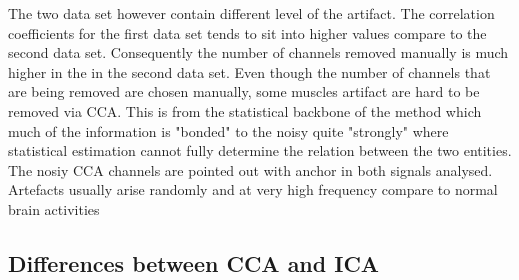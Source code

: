 The two data set however contain different level of the artifact. The correlation coefficients for the first data set tends to sit into higher values compare to the second data set. Consequently the number of channels removed manually is much higher in the in the second data set. Even though the number of channels that are being removed are chosen manually, some  muscles artifact are hard to be removed via CCA. This is from the statistical backbone of the method which much of the information is "bonded" to the noisy quite "strongly" where statistical estimation cannot fully determine the relation between the two entities. The nosiy CCA channels are pointed out with anchor in both signals analysed. Artefacts usually arise randomly and at very high frequency compare to normal brain activities

\newpage
\subsection{Differences between CCA and ICA}


